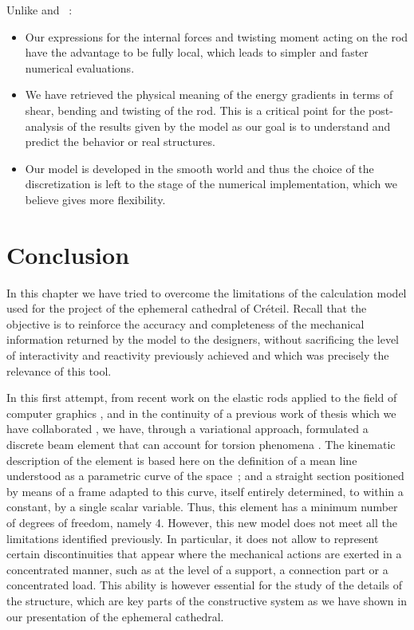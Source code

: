Unlike  and ~:
\begin{itemize}
\item Our expressions for the internal forces and twisting moment acting on the rod have the advantage to be fully local, which leads to simpler and faster numerical evaluations.
\item We have retrieved the physical meaning of the energy gradients in terms of shear, bending and twisting of the rod. This is a critical point for the post-analysis of the results given by the model as our goal is to understand and predict the behavior or real structures.
\item Our model is developed in the smooth world and thus the choice of the discretization is left to the stage of the numerical implementation, which we believe gives more flexibility.
\end{itemize}

\section{Conclusion}

In this chapter we have tried to overcome the limitations of the calculation model used for the project of the ephemeral cathedral of Créteil. Recall that the objective is to reinforce the accuracy and completeness of the mechanical information returned by the model to the designers, without sacrificing the level of interactivity and reactivity previously achieved and which was precisely the relevance of this tool.

In this first attempt, from recent work on the elastic rods applied to the field of computer graphics \cite {Bergou2008}, and in the continuity of a previous work of thesis which we have collaborated \cite{Tayeb2015a}, we have, through a variational approach, formulated a discrete beam element that can account for torsion phenomena \cite{Lefevre2017}. The kinematic description of the element is based here on the definition of a mean line understood as a parametric curve of the space~; and a straight section positioned by means of a frame adapted to this curve, itself entirely determined, to within a constant, by a single scalar variable. Thus, this element has a minimum number of degrees of freedom, namely 4. However, this new model does not meet all the limitations identified previously. In particular, it does not allow to represent certain discontinuities that appear where the mechanical actions are exerted in a concentrated manner, such as at the level of a support, a connection part or a concentrated load. This ability is however essential for the study of the details of the structure, which are key parts of the constructive system as we have shown in our presentation of the ephemeral cathedral.

